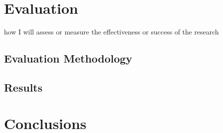 \documentclass{article}
\begin{document}
\section{Evaluation}

how I will assess or measure the effectiveness or success of the research

\subsection{Evaluation Methodology}
\subsection{Results}


\section{Conclusions}



\end{document}
